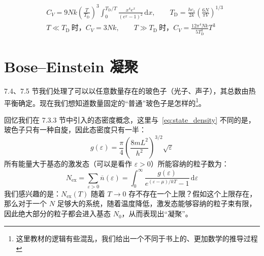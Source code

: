 \begin{corollary}
    \begin{align}
        &C_V=9Nk\left(\frac{T}{T_\mathrm{D}}\right)^3\int_0^{T_\mathrm{D}/T}\frac{x^4e^x}{(e^x-1)^2}\,\mathrm{d}x,\qquad T_\mathrm{D}=\frac{hc_s}{2k}\left(\frac{6N}{\pi V}\right)^{1/3}\\
        &T \ll T_\mathrm{D}\ \text{时，} C_V = 3Nk,\qquad T \gg T_\mathrm{D}\ \text{时，} C_V = \frac{12\pi^4Nk}{5T_\mathrm{D}^3}T^3
    \end{align}
\end{corollary}

\section{Bose--Einstein 凝聚}
7.4、7.5 节我们处理了可以以任意数量存在的玻色子（光子、声子），其总数由热平衡确定。现在我们想知道数量固定的``普通''玻色子是怎样的\footnote{这里教材的逻辑有些混乱，我们给出一个不同于书上的、更加数学的推导过程}。

回忆我们在 7.3.3 节中引入的态密度概念，这里与~\eqref{eq:state_density} 不同的是，玻色子只有一种自旋，因此态密度只有一半：
\begin{equation}
    g(\varepsilon)=\frac{\pi}{4} \left(\frac{8mL^2}{h^2}\right)^{3/2}\sqrt{\varepsilon}
\end{equation}
所有能量大于基态的激发态（可以是看作 $\varepsilon>0$）所能容纳的粒子数为：
\begin{equation}
    N_\mathrm{ex} = \sum_{\varepsilon>0} \overline n(\varepsilon) = \int_0^\infty \frac{g(\varepsilon)}{e^{(\varepsilon-\mu)/kT}-1}\,\mathrm{d}\varepsilon
\end{equation}
我们感兴趣的是：$N_\mathrm{ex}(T)$ 随着 $T\to0$ 存不存在一个上限？假如这个上限存在，那么对于一个 $N$ 足够大的系统，随着温度降低，激发态能够容纳的粒子束有限，因此绝大部分的粒子都会进入基态 $N_0$，从而表现出``凝聚''。

